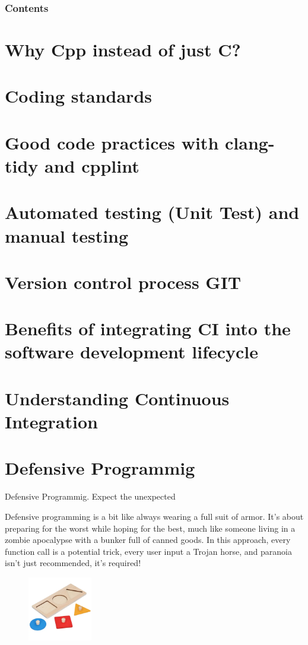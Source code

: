 \documentclass[10pt]{beamer}
\title[Universidad Panamericana]{}
\subtitle{FreeRTOS Architecture Part 1}
\author[]{Name}
\institute[ltonix@up.edu.mx]{Universidad Panamericana}
\date[Presentation \today]{Presentation \today}
\begin{document}
\frame{\titlepage}
\begin{frame}
\frametitle{Contents}
\tableofcontents
\end{frame}


\section{Why Cpp instead of just C?}
\section{Coding standards}
\section{Good code practices with clang-tidy and cpplint}
\section{Automated testing (Unit Test) and manual testing}
\section{Version control process GIT}
\section{Benefits of integrating CI into the software development lifecycle}
\section{Understanding Continuous Integration}

\section{Defensive Programmig}

\begin{frame}{Defensive Programmig. Expect the unexpected}
  
Defensive programming is a bit like always wearing a full suit of armor. It’s about preparing for the worst while hoping for the best, much like someone living in a zombie apocalypse with a bunker full of canned goods. In this approach, every function call is a potential trick, every user input a Trojan horse, and paranoia isn’t just recommended, it’s required!

  \begin{figure}[h]
    \centering
    \includegraphics[width=0.25\textwidth]{figures/BadDummpyProof.png}
    \label{fig:BadDummpyProof}
  \end{figure}


\end{frame}
\end{document}
